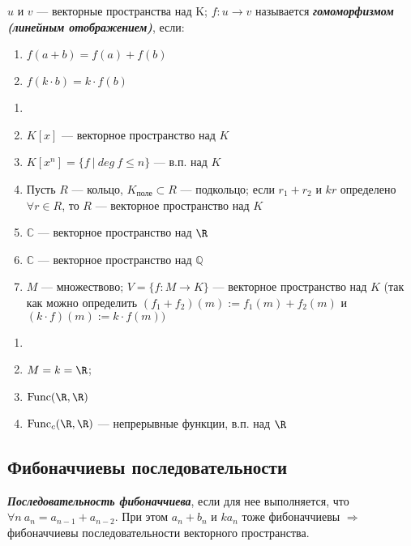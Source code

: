 \begin{definition}$u$ и $v$ — векторные пространства над K; 
$f:u\rightarrow v$ называется \textbf{\textit{гомоморфизмом (линейным 
отображением)}}, если:
\begin{enumerate}
    \item $f(a+b)=f(a)+f(b)$  
    \item $f(k\cdot b)=k\cdot f(b)$
\end{enumerate}
\end{definition}

\begin{example}
    \begin{enumerate}
        \item[]
        \item $K[x]$ — векторное пространство над $K$
        \item $K[x^n]=\{f\ |\ deg\ f\leq n\}$ — в.п. над $K$
        \item Пусть $R$ — кольцо, $K_{\text{поле}}\subset R$ — подкольцо; 
если $r_1+r_2$ и $kr$ определено $\forall r\in R$, то $R$ — векторное 
пространство над $K$
        \item $\mathbb{C}$ — векторное пространство над $\R$
        \item $\mathbb{C}$ — векторное пространство над $\mathbb{Q}$
        \item $M$ — множествово; $V=\{f:M\rightarrow K\}$ — векторное 
пространство над $K$ (так как можно определить 
$(f_1+f_2)(m):=f_1(m)+f_2(m)$ и $(k\cdot f)(m):=k\cdot f(m))$
    \end{enumerate}
\end{example}

\begin{example}
    \begin{enumerate}
        \item[]
        \item[] $M=k=\R$; 
        \item $\text{Func}(\R,\R)$
        \item $\text{Func}_c(\R,\R)$ — непрерывные функции, в.п. над $\R$
    \end{enumerate}
\end{example}

\subsection{Фибоначчиевы последовательности}

\begin{definition}
    \textbf{\textit{Последовательность фибоначчиева}}, если для нее 
выполняется, что $\forall n\ a_n =a_{n-1}+a_{n-2}$. При этом $a_n+b_n$ и 
$ka_n$ тоже фибоначчиевы $\Rightarrow$  фибоначчиевы последовательности 
векторного пространства.
\end{definition}

